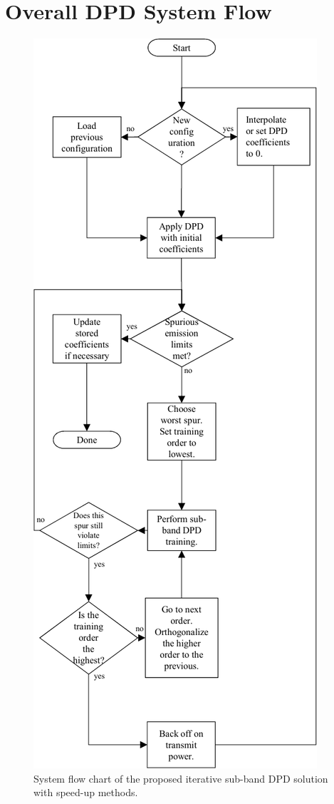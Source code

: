 \section{Overall DPD System Flow}
\label{sec:SystemFlow}
\begin{figure}
	\centering
	\centerline{\includegraphics[]{FlowChart1column.pdf}}
	\caption[]{System flow chart of the proposed iterative sub-band DPD solution with speed-up methods.}
	\label{fig:SystemFlowChart}
\end{figure}
